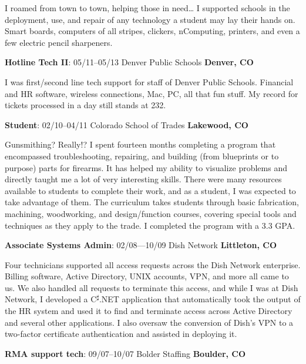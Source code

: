 \documentclass[letterpaper,12pt]{article}
\begin{document}
I roamed from town to town, helping those in need\ldots{} I supported schools in
the deployment, use, and repair of any technology a student may lay their hands
on. Smart boards, computers of all stripes, clickers, nComputing, printers, and
even a few electric pencil sharpeners.

\begin{flushleft}
\textbf{Hotline Tech II}: 05/11--05/13 Denver Public Schools \textbf{Denver, CO}
\end{flushleft}

I was first/second line tech support for staff of Denver Public Schools.
Financial and HR software, wireless connections, Mac, PC, all that fun stuff.
My record for tickets processed in a day still stands at 232.

\begin{flushleft}
\textbf{Student}: 02/10--04/11 Colorado School of Trades \textbf{Lakewood, CO}
\end{flushleft}

Gunsmithing? Really!? I spent fourteen months completing a program that
encompassed troubleshooting, repairing, and building (from blueprints or to
purpose) parts for firearms. It has helped my ability to visualize problems
and directly taught me a lot of very interesting skills. There were many
resources available to students to complete their work, and as a student, I
was expected to take advantage of them. The curriculum takes students through
basic fabrication, machining, woodworking, and design/function courses,
covering special tools and techniques as they apply to the trade. I completed
the program with a 3.3 GPA.

\newpage
\begin{flushleft}
\textbf{Associate Systems Admin}: 02/08---10/09 Dish Network
\textbf{Littleton, CO}
\end{flushleft}

Four technicians supported all access requests across the Dish Network
enterprise. Billing software, Active Directory, UNIX accounts, VPN, and more
all came to us. We also handled all requests to terminate this access, and
while I was at Dish Network, I developed a C\textsuperscript{{$\sharp$}}.NET
application that automatically took the output of the HR system and used it to
find and terminate access across Active Directory and several other
applications. I also oversaw the conversion of Dish's VPN to a two-factor
certificate authentication and assisted in deploying it.

\begin{flushleft}
\textbf{RMA support tech}: 09/07--10/07 Bolder Staffing \textbf{Boulder, CO}
\end{flushleft}
\end{document}
